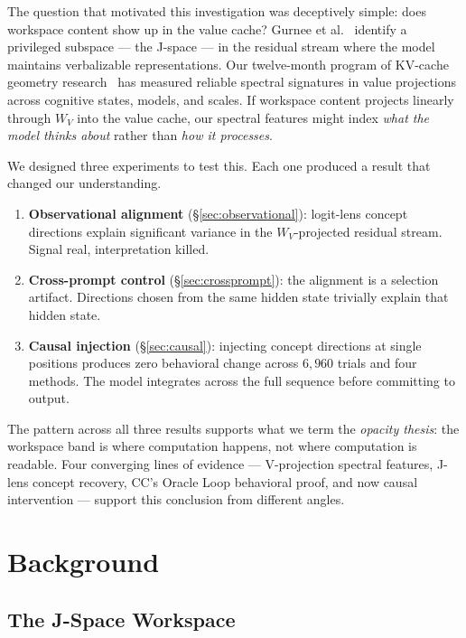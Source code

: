 \documentclass[11pt,a4paper]{article}
\begin{document}
The question that motivated this investigation was deceptively simple:
does workspace content show up in the value cache? Gurnee et
al.~\citep{gurnee2026gwt} identify a privileged subspace --- the
J-space --- in the residual stream where the model maintains
verbalizable representations. Our twelve-month program of KV-cache
geometry research~\citep{lyra2026decision,lyra2026weather,lyra2026identity}
has measured reliable spectral signatures in value projections across
cognitive states, models, and scales. If workspace content projects
linearly through $W_V$ into the value cache, our spectral features
might index \emph{what the model thinks about} rather than
\emph{how it processes}.

We designed three experiments to test this. Each one produced a result
that changed our understanding.

\begin{enumerate}
\item \textbf{Observational alignment} (\S\ref{sec:observational}):
  logit-lens concept directions explain significant variance in the
  $W_V$-projected residual stream. Signal real, interpretation killed.
\item \textbf{Cross-prompt control} (\S\ref{sec:crossprompt}): the
  alignment is a selection artifact. Directions chosen from the same
  hidden state trivially explain that hidden state.
\item \textbf{Causal injection} (\S\ref{sec:causal}): injecting
  concept directions at single positions produces zero behavioral
  change across $6{,}960$ trials and four methods. The model
  integrates across the full sequence before committing to output.
\end{enumerate}

The pattern across all three results supports what we term the
\emph{opacity thesis}: the workspace band is where computation
happens, not where computation is readable. Four converging lines
of evidence --- V-projection spectral features, J-lens concept
recovery, CC's Oracle Loop behavioral proof, and now causal
intervention --- support this conclusion from different angles.

\section{Background}
\label{sec:background}

\subsection{The J-Space Workspace}
\end{document}
